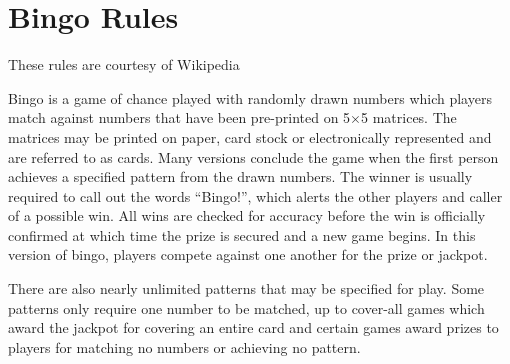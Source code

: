 \section{Bingo Rules} 
\label{sec:bingorules}

These rules are courtesy of Wikipedia\cite{website:bingo-rules}

Bingo is a game of chance played with randomly drawn numbers which players
match against numbers that have been pre-printed on 5$\times$5 matrices. The
matrices may be printed on paper, card stock or electronically represented and
are referred to as cards. Many versions conclude the game when the first person
achieves a specified pattern from the drawn numbers. The winner is usually
required to call out the words ``Bingo!'', which alerts the other players and
caller of a possible win. All wins are checked for accuracy before the win is
officially confirmed at which time the prize is secured and a new game begins.
In this version of bingo, players compete against one another for the prize or
jackpot.

There are also nearly unlimited patterns that may be specified for play. Some
patterns only require one number to be matched, up to cover-all games which
award the jackpot for covering an entire card and certain games award prizes
to players for matching no numbers or achieving no pattern.

